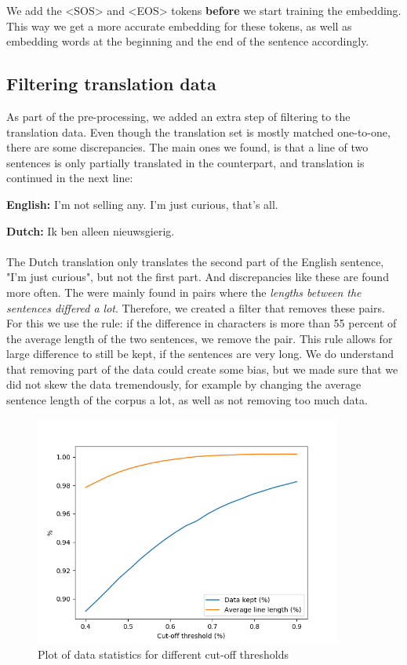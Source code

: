 \documentclass{article}
\begin{document}
We add the <SOS> and <EOS> tokens \textbf{before} we start training the embedding. This way we get a more accurate embedding for these tokens, as well as embedding words at the beginning and the end of the sentence accordingly.

\subsection*{Filtering translation data}
As part of the pre-processing, we added an extra step of filtering to the translation data. Even though the translation set is mostly matched one-to-one, there are some discrepancies. The main ones we found, is that a line of two sentences is only partially translated in the counterpart, and translation is continued in the next line:

\textbf{English:}   I'm not selling any. I'm just curious, that's all.

\textbf{Dutch:} Ik ben alleen nieuwsgierig.\\
\\
The Dutch translation only translates the second part of the English sentence, "I'm just curious", but not the first part. And discrepancies like these are found more often. The were mainly found in pairs where the \textit{lengths between the sentences differed a lot}. Therefore, we created a filter that removes these pairs. For this we use the rule: if the difference in characters is more than 55 percent of the average length of the two sentences, we remove the pair. This rule allows for large difference to still be kept, if the sentences are very long. We do understand that removing part of the data could create some bias, but we made sure that we did not skew the data tremendously, for example by changing the average sentence length of the corpus a lot, as well as not removing too much data.

\begin{figure}[H]
    \centering
    \includegraphics[width=0.9\textwidth]{imgs/cutoff.png}
    \caption{Plot of data statistics for different cut-off thresholds}
    \label{fig:cutoff}
\end{figure}
\end{document}
